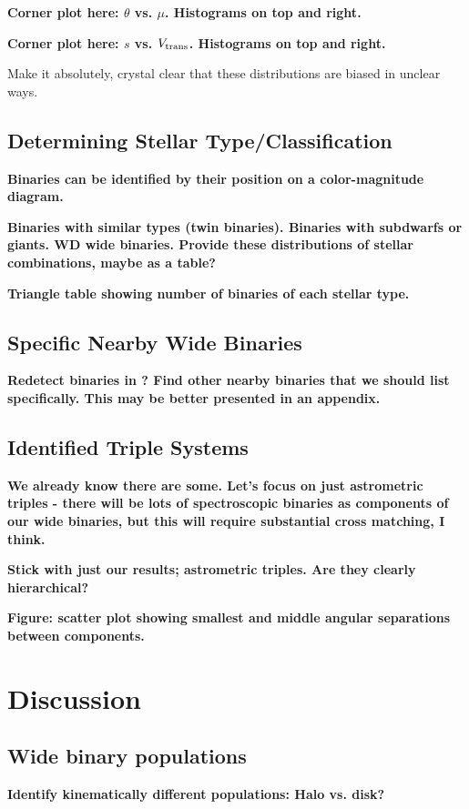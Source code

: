 \documentclass[usenatbib]{mnras}
\begin{document}
{\bf Corner plot here: $\theta$ vs. $\mu$. Histograms on top and right. }

{\bf Corner plot here: $s$ vs. $V_{\rm trans}$. Histograms on top and right.}

Make it absolutely, crystal clear that these distributions are biased in unclear ways.


\subsection{Determining Stellar Type/Classification}

{\bf Binaries can be identified by their position on a color-magnitude diagram.}

{\bf Binaries with similar types (twin binaries). Binaries with subdwarfs or giants. WD wide binaries. Provide these distributions of stellar combinations, maybe as a table?}

{\bf Triangle table showing number of binaries of each stellar type.}


\subsection{Specific Nearby Wide Binaries}
{\bf Redetect binaries in \citet{shaya11}? Find other nearby binaries that we should list specifically. This may be better presented in an appendix.}




\subsection{Identified Triple Systems} 
{\bf We already know there are some. Let's focus on just astrometric triples - there will be lots of spectroscopic binaries as components of our wide binaries, but this will require substantial cross matching, I think.}

{\bf Stick with just our results; astrometric triples. Are they clearly hierarchical?}

{\bf Figure: scatter plot showing smallest and middle angular separations between components.}




\section{Discussion}


\subsection{Wide binary populations}
{\bf Identify kinematically different populations: Halo vs. disk?}
\end{document}
